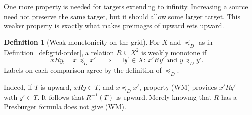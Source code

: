 \documentclass[11pt,a4paper]{article}
\theoremstyle{definition}
\newtheorem{definition}[theorem]{Definition}
\theoremstyle{remark}
\begin{document}
One more property is needed for targets extending to infinity.
Increasing a source need not preserve the same target, but it should
allow some larger target. This weaker property is exactly what makes
preimages of upward sets upward.

\begin{definition}[Weak monotonicity on the grid]
\label{def:weak-monotonicity}
For \(X\) and \(\preceq_D\) as in
Definition~\ref{def:grid-order}, a relation \(R\subseteq X^2\)
is weakly monotone if
\[
 xRy,\quad x\preceq_D x'
 \quad\Longrightarrow\quad
 \exists y'\in X:\ x'Ry'\ \text{and }y\preceq_D y'.
 \tag{WM}
\]
Labels on each comparison agree by the definition of \(\preceq_D\).
\end{definition}

Indeed, if \(T\) is upward, \(xRy\in T\), and \(x\preceq_D x'\),
property (WM) provides \(x'Ry'\) with \(y'\in T\).
It follows that \(R^{-1}(T)\) is upward. Merely knowing that \(R\)
has a Presburger formula does not give (WM).
\end{document}
